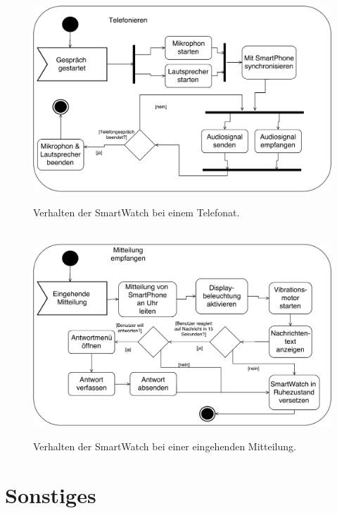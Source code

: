\begin{appendices}
\begin{figure}[h]
\centering\
\includegraphics[width=\textwidth]{img/activityTelefonieren}
\caption{Verhalten der SmartWatch bei einem Telefonat.}\label{fig:activityTelefonieren}
\end{figure}

\begin{figure}[h]
\centering\
\includegraphics[width=\textwidth]{img/activityMitteilung}
\caption{Verhalten der SmartWatch bei einer eingehenden Mitteilung.}\label{fig:activityMitteilung}
\end{figure}

\section{Sonstiges}


\end{appendices}
